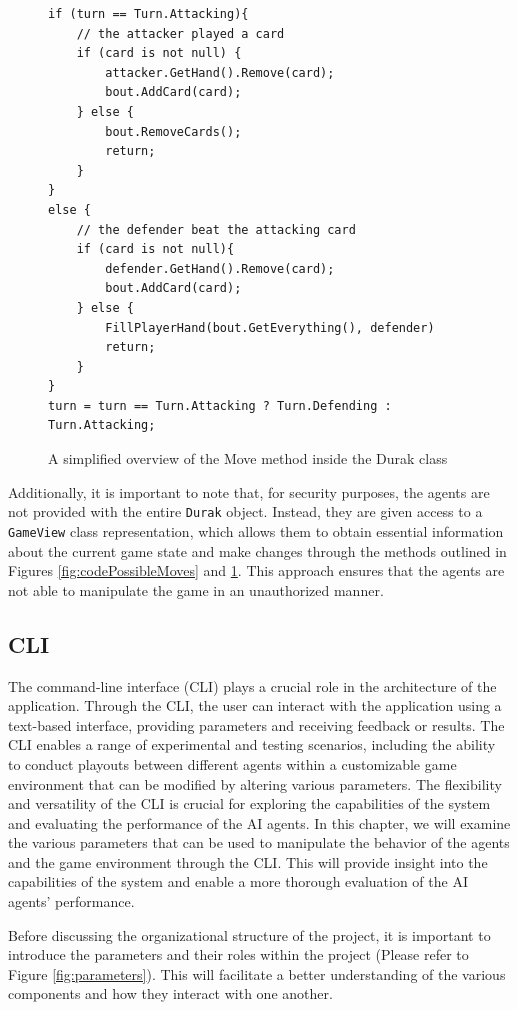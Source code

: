 \begin{figure}[h]
\captionsetup{justification=centering}
\begin{lstlisting}
if (turn == Turn.Attacking){
	// the attacker played a card	
	if (card is not null) {
		attacker.GetHand().Remove(card);
		bout.AddCard(card);
	} else {
		bout.RemoveCards();
		return;
	}
}
else {
	// the defender beat the attacking card
	if (card is not null){
		defender.GetHand().Remove(card);
		bout.AddCard(card);
	} else {
		FillPlayerHand(bout.GetEverything(), defender)
		return;
	}	
}
turn = turn == Turn.Attacking ? Turn.Defending : Turn.Attacking;
\end{lstlisting}
\caption{A simplified overview of the Move method inside the Durak class}
\label{fig:codeMove}
\end{figure}

Additionally, it is important to note that, for security purposes, the agents are not provided with the entire \texttt{Durak} object. Instead, they are given access to a \texttt{GameView} class representation, which allows them to obtain essential information about the current game state and make changes through the methods outlined in Figures \ref{fig:codePossibleMoves} and \ref{fig:codeMove}. This approach ensures that the agents are not able to manipulate the game in an unauthorized manner.


\subsection{CLI}
\label{CLI}

The command-line interface (CLI) plays a crucial role in the architecture of the application. Through the CLI, the user can interact with the application using a text-based interface, providing parameters and receiving feedback or results. The CLI enables a range of experimental and testing scenarios, including the ability to conduct playouts between different agents within a customizable game environment that can be modified by altering various parameters. The flexibility and versatility of the CLI is crucial for exploring the capabilities of the system and evaluating the performance of the AI agents. In this chapter, we will examine the various parameters that can be used to manipulate the behavior of the agents and the game environment through the CLI. This will provide insight into the capabilities of the system and enable a more thorough evaluation of the AI agents' performance.

Before discussing the organizational structure of the project, it is important to introduce the parameters and their roles within the project (Please refer to Figure \ref{fig:parameters}). This will facilitate a better understanding of the various components and how they interact with one another. 

